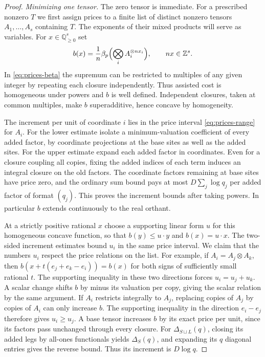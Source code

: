 \begin{proof}
\emph{Minimizing one tensor.}
The zero tensor is immediate. For a prescribed nonzero \(T\) we first
assign prices to a finite list of distinct nonzero tensors \(A_1,\ldots,A_s\)
containing \(T\). The exponents of their mixed products will serve as
variables. For \(x\in\mathbb Q_{\ge0}^s\) set
\[
 b(x)=\frac1n\beta_p\Bigl(\bigotimes_i A_i^{\otimes nx_i}\Bigr),
 \qquad nx\in\mathbb Z^s.
\]
In \eqref{eq:prices-beta} the supremum can be restricted to multiples
of any given integer by repeating each closure independently. Thus assisted
cost is homogeneous under powers and \(b\) is well defined.
Independent closures, taken at common multiples, make \(b\)
superadditive, hence concave by homogeneity.

The increment per unit of coordinate \(i\) lies in the price interval
\eqref{eq:prices-range} for \(A_i\). For the lower estimate isolate a
minimum-valuation coefficient of every added factor, by coordinate
projections at the base sites as well as the added sites. For the upper
estimate expand each added factor in coordinates. Even for a closure
coupling all copies, fixing the added indices of each term induces an
integral closure on the old factors. The coordinate factors remaining at
base sites have price zero, and the ordinary sum bound pays at most
\(D\sum_j\log q_j\) per added factor of format \((q_j)\).
This proves the increment bounds after taking powers. In particular \(b\)
extends continuously to the real orthant.

At a strictly positive rational \(x\) choose a supporting linear form
\(u\) for this homogeneous concave function, so that
\(b(y)\le u\cdot y\) and \(b(x)=u\cdot x\).
The two-sided increment estimates bound \(u_i\) in the same price
interval. We claim that the numbers \(u_i\) respect the price relations on the
list. For example, if \(A_i=A_j\otimes A_k\), then
\(b(x+t(e_j+e_k-e_i))=b(x)\) for both signs of sufficiently small
rational \(t\). The supporting inequality in these two directions forces
\(u_i=u_j+u_k\). A scalar change shifts \(b\) by minus its valuation
per copy, giving the scalar relation by the same argument. If \(A_i\)
restricts integrally to \(A_j\), replacing copies of \(A_j\) by
copies of \(A_i\) can only increase \(b\). The supporting inequality
in the direction \(e_i-e_j\) therefore gives \(u_i\ge u_j\).
A base tensor increases \(b\) by its exact price per unit,
since its factors pass unchanged through every closure.
For \(\Delta_{S\sqcup L}(q)\), closing its added legs by all-ones
functionals yields \(\Delta_S(q)\), and expanding its \(q\) diagonal
entries gives the reverse bound. Thus its increment is \(D\log q\).


\end{proof}
